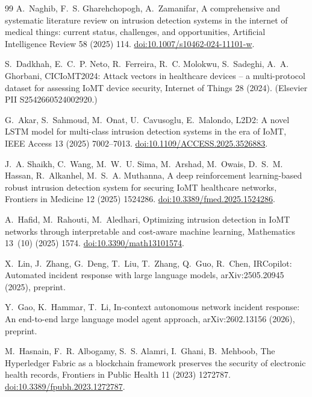 \documentclass[preprint,12pt]{elsarticle}
\begin{document}
\begin{thebibliography}{99}
\small
{} A.~Naghib, F.~S. Gharehchopogh, A.~Zamanifar, A comprehensive and systematic literature review on intrusion detection systems in the internet of medical things: current status, challenges, and opportunities, Artificial Intelligence Review 58 (2025) 114. \href{https://doi.org/10.1007/s10462-024-11101-w}{doi:10.1007/s10462-024-11101-w}.

 S.~Dadkhah, E.~C.~P. Neto, R.~Ferreira, R.~C. Molokwu, S.~Sadeghi, A.~A. Ghorbani, CICIoMT2024: Attack vectors in healthcare devices -- a multi-protocol dataset for assessing IoMT device security, Internet of Things 28 (2024). (Elsevier PII S2542660524002920.) %

 G.~Akar, S.~Sahmoud, M.~Onat, U.~Cavusoglu, E.~Malondo, L2D2: A novel LSTM model for multi-class intrusion detection systems in the era of IoMT, IEEE Access 13 (2025) 7002--7013. \href{https://doi.org/10.1109/ACCESS.2025.3526883}{doi:10.1109/ACCESS.2025.3526883}.

 J.~A. Shaikh, C.~Wang, M.~W.~U. Sima, M.~Arshad, M.~Owais, D.~S.~M. Hassan, R.~Alkanhel, M.~S.~A. Muthanna, A deep reinforcement learning-based robust intrusion detection system for securing IoMT healthcare networks, Frontiers in Medicine 12 (2025) 1524286. \href{https://doi.org/10.3389/fmed.2025.1524286}{doi:10.3389/fmed.2025.1524286}.

 A.~Hafid, M.~Rahouti, M.~Aledhari, Optimizing intrusion detection in IoMT networks through interpretable and cost-aware machine learning, Mathematics 13~(10) (2025) 1574. \href{https://doi.org/10.3390/math13101574}{doi:10.3390/math13101574}.

 X.~Lin, J.~Zhang, G.~Deng, T.~Liu, T.~Zhang, Q.~Guo, R.~Chen, IRCopilot: Automated incident response with large language models, arXiv:2505.20945 (2025), preprint.

 Y.~Gao, K.~Hammar, T.~Li, In-context autonomous network incident response: An end-to-end large language model agent approach, arXiv:2602.13156 (2026), preprint.

 M.~Hasnain, F.~R. Albogamy, S.~S. Alamri, I.~Ghani, B.~Mehboob, The Hyperledger Fabric as a blockchain framework preserves the security of electronic health records, Frontiers in Public Health 11 (2023) 1272787. \href{https://doi.org/10.3389/fpubh.2023.1272787}{doi:10.3389/fpubh.2023.1272787}.


\end{thebibliography}
\end{document}
